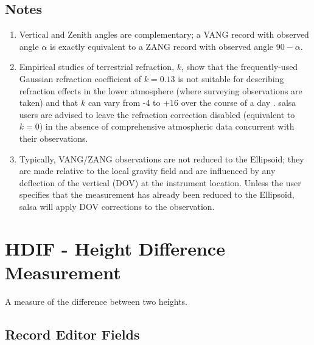 \subsection*{Notes}
\begin{enumerate}
\item Vertical and Zenith angles are complementary; a VANG record with observed angle $\alpha$ is exactly equivalent to a ZANG record with observed angle $90 - \alpha$.
\item Empirical studies of terrestrial refraction, $k$, show that the frequently-used Gaussian refraction coefficient of $k=0.13$ is not suitable for describing refraction effects in the lower atmosphere (where surveying observations are taken) and that $k$ can vary from -4 to +16 over the course of a day \cite{Hirt}.  \textsf{salsa} users are advised to leave the refraction correction disabled (equivalent to $k=0$) in the absence of comprehensive atmospheric data concurrent with their observations.
\item Typically, VANG/ZANG observations are not reduced to the Ellipsoid; they are made relative to the local gravity field and are influenced by any deflection of the vertical (DOV) at the instrument location.  Unless the user specifies that the measurement has already been reduced to the Ellipsoid, \textsf{salsa} will apply DOV corrections to the observation.
\end{enumerate}


\newpage
\section{HDIF - Height Difference Measurement}

A measure of the difference between two heights.

\subsection*{Record Editor Fields}

